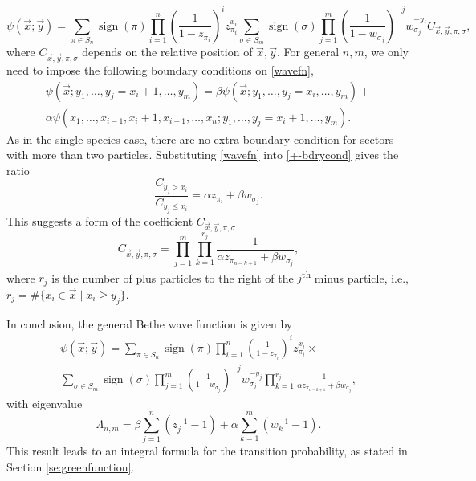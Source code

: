 \documentclass[cmp]{svjour}
\numberwithin{theorem}{section}
\numberwithin{equation}{section}
\DeclareMathOperator{\sign}{sign}
\begin{document}
\begin{equation}
\psi(\vec{x};\vec{y})
=
\sum_{\pi\in S_n}\sign(\pi)
\prod_{i=1}^{n}
\left(\frac{1}{1-z_{\pi_i}}\right)^i
z_{\pi_i}^{x_i}
\sum_{\sigma\in S_m}\sign(\sigma)
\prod_{j=1}^{m}
\left(\frac{1}{1-w_{\sigma_j}}\right)^{-j}
w_{\sigma_j}^{-y_j}C_{\vec{x},\vec{y},\pi,\sigma},
\label{wavefn}
\end{equation}
where $C_{\vec{x},\vec{y},\pi,\sigma}$ depends on the relative position of $\vec{x},\vec{y}$. For general $n,m$, we only need to impose the following boundary conditions on \eqref{wavefn},
\begin{multline}
\psi(\vec{x};
y_1,\dots,y_j=x_i+1,\dots,y_m)
=
\beta\psi(\vec{x};
y_1,\dots,y_j=x_i,\dots,y_m) +
\\
\alpha \psi(x_1,\dots,x_{i-1},x_i+1,x_{i+1},\dots,x_n;
y_1,\dots,y_j=x_i+1,\dots,y_m).
\label{+-bdrycond}
\end{multline}
As in the single species case, there are no extra boundary condition for sectors with more than two particles. Substituting \eqref{wavefn} into \eqref{+-bdrycond} gives the ratio
\begin{equation*}
\frac{C_{y_j>x_i}}{C_{y_j\leq x_i}}
=
\alpha z_{\pi_i}+\beta w_{\sigma_j}.
\end{equation*}
This suggests a form of the coefficient $C_{\vec{x},\vec{y},\pi,\sigma}$
\begin{equation*}
C_{\vec{x},\vec{y},\pi,\sigma}
=
\prod_{j=1}^m
\prod_{k=1}^{r_j}
\frac{1}{\alpha z_{\pi_{n-k+1}}+\beta w_{\sigma_j}},
\end{equation*}
where $r_j$ is the number of plus particles to the right of the $j$\textsuperscript{th} minus particle, i.e., $r_j=\#\{x_i\in\vec{x}\mid x_i \geq y_j\}$.

In conclusion, the general Bethe wave function is given by
\begin{multline}
\label{eq:BAfull}
\psi(\vec{x};\vec{y})=
\sum_{\pi\in S_n}\sign(\pi)
\prod_{i=1}^{n}
\left(\frac{1}{1-z_{\pi_i}}\right)^i
z_{\pi_i}^{x_i} \times\\
\sum_{\sigma\in S_m}\sign(\sigma)
\prod_{j=1}^{m}
\left(\frac{1}{1-w_{\sigma_j}}\right)^{-j}
w_{\sigma_j}^{-y_j}
\prod_{k=1}^{r_j}
\frac{1}{\alpha z_{\pi_{n-k+1}}+\beta w_{\sigma_j}},
\end{multline}
with eigenvalue
\begin{equation}
\Lambda_{n,m}
=
\beta \sum_{j=1}^n (z_j^{-1}-1) +
\alpha \sum_{k=1}^m (w_k^{-1}-1).
\label{eigvalue}
\end{equation}
This result leads to an integral formula for the transition probability, as stated in Section \ref{se:greenfunction}.
\end{document}
